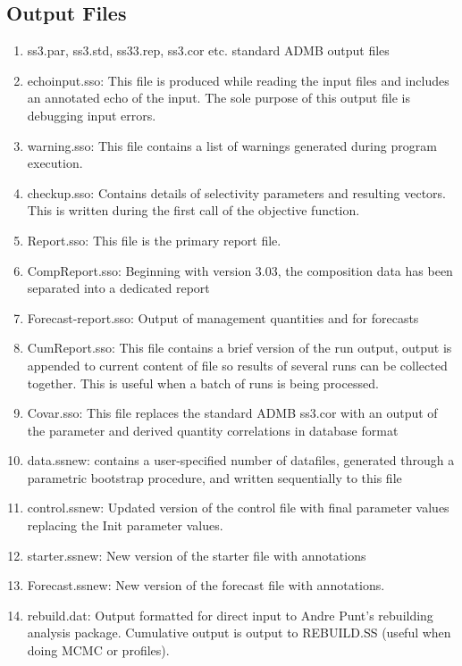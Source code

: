 	\subsection{Output Files}
	\begin{enumerate}
		\item ss3.par, ss3.std, ss33.rep, ss3.cor etc.  standard ADMB output files
		\item echoinput.sso:  This file is produced while reading the input files and includes an annotated echo of the input.  The sole purpose of this output file is debugging input errors.
		\item warning.sso:  This file contains a list of warnings generated during program execution.
		\item checkup.sso:  Contains details of selectivity parameters and resulting vectors.  This is written during the first call of the objective function.
		\item Report.sso:  This file is the primary report file.
		\item CompReport.sso:  Beginning with version 3.03, the composition data has been separated into a dedicated report
		\item Forecast-report.sso:  Output of management quantities and for forecasts
		\item CumReport.sso:  This file contains a brief version of the run output, output is appended to current content of file so results of several runs can be collected together.  This is useful when a batch of runs is being processed.
		\item Covar.sso:  This file replaces the standard ADMB ss3.cor with an output of the parameter and derived quantity correlations in database format
		\item data.ss\textunderscore new:  contains a user-specified number of datafiles, generated through a parametric bootstrap procedure, and written sequentially to this file
		\item control.ss\textunderscore new:  Updated version of the control file with final parameter values replacing the Init parameter values.
		\item starter.ss\textunderscore new:  New version of the starter file with annotations
		\item Forecast.ss\textunderscore new:  New version of the forecast file with annotations.
		\item rebuild.dat:  Output formatted for direct input to Andre Punt's rebuilding analysis package.  Cumulative output is output to REBUILD.SS (useful when doing MCMC or profiles).
	\end{enumerate}

